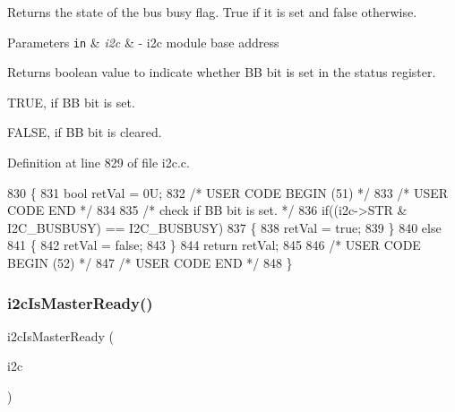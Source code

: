 Returns the state of the bus busy flag. True if it is set and false otherwise. 


\begin{DoxyParams}[1]{Parameters}
\mbox{\tt in}  & {\em i2c} & -\/ i2c module base address \\
\hline
\end{DoxyParams}
\begin{DoxyReturn}{Returns}
boolean value to indicate whether BB bit is set in the status register.
\begin{DoxyItemize}
\item T\+R\+UE, if BB bit is set.
\item F\+A\+L\+SE, if BB bit is cleared. 
\end{DoxyItemize}
\end{DoxyReturn}


Definition at line 829 of file i2c.\+c.


\begin{DoxyCode}
830 \{
831     \textcolor{keywordtype}{bool} retVal = 0U;
832 \textcolor{comment}{/* USER CODE BEGIN (51) */}
833 \textcolor{comment}{/* USER CODE END */}
834 
835     \textcolor{comment}{/* check if BB bit is set. */}
836     \textcolor{keywordflow}{if}((i2c->STR & I2C\_BUSBUSY) == I2C\_BUSBUSY)
837     \{
838         retVal = \textcolor{keyword}{true};
839     \}
840     \textcolor{keywordflow}{else}
841     \{
842         retVal = \textcolor{keyword}{false};
843     \}
844     \textcolor{keywordflow}{return} retVal;
845 
846 \textcolor{comment}{/* USER CODE BEGIN (52) */}
847 \textcolor{comment}{/* USER CODE END */}
848 \}
\end{DoxyCode}
\mbox{\label{group__I2C_ga09ef340f59e7eb274327077b26d77572}} 
\subsubsection{\texorpdfstring{i2c\+Is\+Master\+Ready()}{i2cIsMasterReady()}}
{\footnotesize\ttfamily i2c\+Is\+Master\+Ready (\begin{DoxyParamCaption}\item[{\mbox{\hyperlink{reg__i2c_8h_a5d6c119fb20e803a530d0d4df544daf7}{i2c\+B\+A\+S\+E\+\_\+t}} $\ast$}]{i2c }\end{DoxyParamCaption})}



